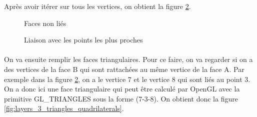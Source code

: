\documentclass[article, backcover, french, nodocumentinfo]{upmethodology-document}
\begin{document}
		Après avoir itérer sur tous les vertices, on obtient la figure \ref{fig:layers_2_nearest_lines}.
		
		\par\noindent\begin{minipage}[t]{\textwidth}
			\centering
			\begin{minipage}[t]{0.49\textwidth}
				\begin{figure}[H]
					\centering%
					\caption{Faces non liés}%
					\label{fig:layers_1_empty}%
				\end{figure}
			\end{minipage}
			\begin{minipage}[t]{0.49\textwidth}
				\begin{figure}[H]
					\centering%
					\caption{Liaison avec les points les plus proches}%
					\label{fig:layers_2_nearest_lines}%
				\end{figure}
			\end{minipage}
		\end{minipage}
		\paragraph{} On va ensuite remplir les faces triangulaires. Pour ce faire, on va regarder si on a des vertices de la face B qui sont rattachées au même vertice de la face A. Par exemple dans la figure \ref{fig:layers_2_nearest_lines}, on a le vertice 7 et le vertice 8 qui sont liés au point 3. On a donc ici une face triangulaire qui peut être calculé par OpenGL avec la primitive GL\_TRIANGLES sous la forme (7-3-8). On obtient donc la figure \ref{fig:layers_3_triangles_quadrilaterals}.
		
\end{document}
